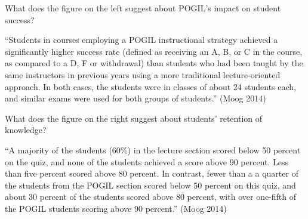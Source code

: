\Q What does the figure on the left suggest about POGIL's impact on student success?

\begin{answer}[6em]
\small
``Students in courses employing a POGIL instructional strategy achieved a significantly higher success rate (defined as receiving an A, B, or C in the course, as compared to a D, F or withdrawal) than students who had been taught by the same instructors in previous years using a more traditional lecture-oriented approach.
In both cases, the students were in classes of about 24 students each, and similar exams were used for both groups of students.'' (Moog 2014)
\end{answer}


\Q What does the figure on the right suggest about students' retention of knowledge?

\begin{answer}[6em]
\small
``A majority of the students (60\%) in the lecture section scored below 50 percent on the quiz, and none of the students achieved a score above 90 percent.
Less than five percent scored above 80 percent.
In contrast, fewer than a a quarter of the students from the POGIL section scored below 50 percent on this quiz, and about 30 percent of the students scored above 80 percent, with over one-fifth of the POGIL
students scoring above 90 percent.'' (Moog 2014)
\end{answer}
